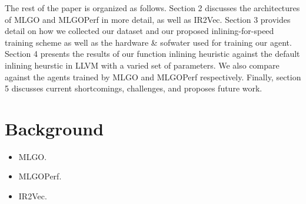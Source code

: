 \documentclass[nohyperref]{article}
\theoremstyle{plain}
\theoremstyle{definition}
\theoremstyle{remark}
\begin{document}
The rest of the paper is organized as follows. Section 2 discusses the architectures of MLGO and MLGOPerf in more detail, as well as IR2Vec. Section 3 provides detail on how we collected our dataset and our proposed inlining-for-speed training scheme as well as the hardware \& sofwater used for training our agent. Section 4 presents the results of our function inlining heuristic against the default inlining heurstic in LLVM with a varied set of parameters. We also compare against the agents trained by MLGO and MLGOPerf respectively. Finally, section 5 discusses current shortcomings, challenges, and proposes future work.





\section{Background}
\label{background}
\begin{itemize}
\item MLGO\@.
\item MLGOPerf\@.
\item IR2Vec\@.
\end{itemize}
\end{document}
